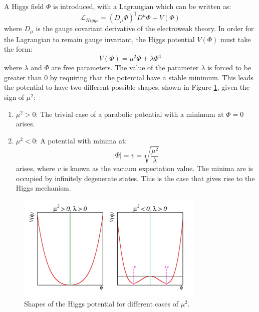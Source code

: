 A Higgs field $\Phi$ is introduced, with a Lagrangian which can be written as:
\begin{equation}
\mathcal{L}_{Higgs} = (D_{\mu}\Phi)^{\dagger}D^{\mu}\Phi + V(\Phi)
\end{equation}
where $D_{\mu}$ is the gauge covariant derivative of the electroweak theory. In order for the Lagrangian to remain gauge invariant, the Higgs potential $V(\Phi)$ must take the form:
\begin{equation}
    V(\Phi) = {\mu}^2{\Phi} + {\lambda}{\Phi}^4
\end{equation}
where $\lambda$ and $\Phi$ are free parameters. The value of the parameter $\lambda$ is forced to be greater than 0 by requiring that the potential have a stable minimum. This leads the potential to have two different possible shapes, shown in Figure \ref{fig:higgspot}, given the sign of $\mu^2$:

\begin{enumerate}
    \item ${\mu^2 > 0}$: The trivial case of a parabolic potential with a minimum at $\Phi = 0$ arises.
    \item ${\mu^2 < 0}$: A potential with minima at:
    \begin{equation}
     |\Phi| = v = \sqrt{\frac{\mu^2}{\lambda}}
    \end{equation}
     arises, where $v$ is known as the vacuum expectation value. The minima are is occupied by infinitely degenerate states. This is the case that gives rise to the Higgs mechanism.
\end{enumerate}

\begin{figure}[h]
    \centering
    \includegraphics[width=0.8\textwidth]{Figures/1/HiggsPotential.png}
    \caption{Shapes of the Higgs potential for different cases of $\mu^2$.}
    \label{fig:higgspot}
\end{figure}

